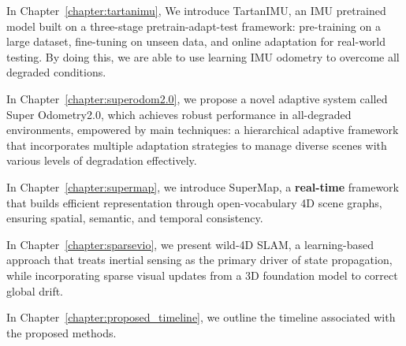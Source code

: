 In Chapter~\ref{chapter:tartanimu},  We introduce TartanIMU,
an IMU pretrained model built on a three-stage pretrain-adapt-test framework: pre-training on a large dataset, fine-tuning on unseen data, and online adaptation for real-world testing. By doing this, we are able to use learning IMU odometry to overcome all degraded conditions. 

In Chapter~\ref{chapter:superodom2.0}, we propose a novel adaptive system called Super Odometry2.0, which achieves robust performance in all-degraded environments, empowered by main techniques: a hierarchical
adaptive framework that incorporates multiple adaptation strategies to
manage diverse scenes with various levels of degradation effectively.

In Chapter~\ref{chapter:supermap}, we introduce SuperMap, a \textbf{real-time} framework that builds efficient representation
through open-vocabulary 4D scene graphs, ensuring spatial, semantic, and temporal consistency.

In Chapter~\ref{chapter:sparsevio}, we present wild-4D SLAM, a learning-based approach that treats inertial sensing as the primary driver of state propagation, while incorporating sparse visual updates from a 3D foundation model to correct global drift.

In Chapter~\ref{chapter:proposed_timeline}, we outline the timeline associated with the proposed methods.








